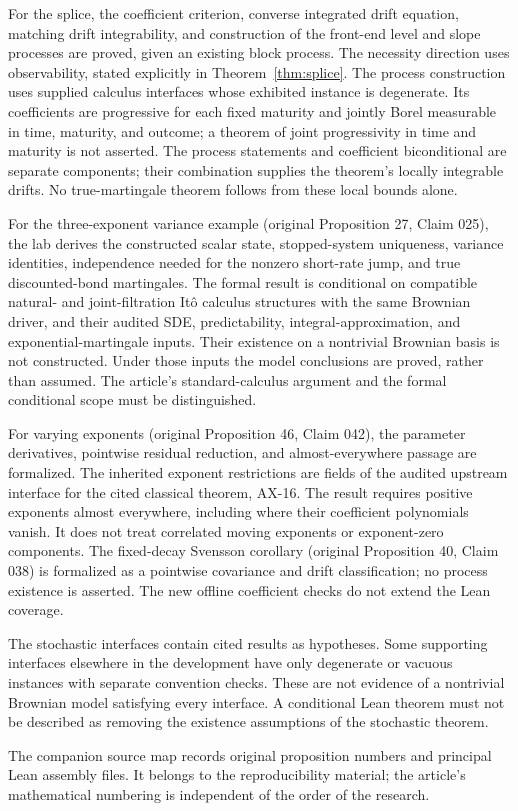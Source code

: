 For the splice, the coefficient criterion, converse integrated drift equation, matching drift integrability, and construction of the front-end level and slope processes are proved, given an existing block process. The necessity direction uses observability, stated explicitly in Theorem~\ref{thm:splice}. The process construction uses supplied calculus interfaces whose exhibited instance is degenerate. Its coefficients are progressive for each fixed maturity and jointly Borel measurable in time, maturity, and outcome; a theorem of joint progressivity in time and maturity is not asserted. The process statements and coefficient biconditional are separate components; their combination supplies the theorem's locally integrable drifts. No true-martingale theorem follows from these local bounds alone.

For the three-exponent variance example (original Proposition 27, Claim 025), the lab derives the constructed scalar state, stopped-system uniqueness, variance identities, independence needed for the nonzero short-rate jump, and true discounted-bond martingales. The formal result is conditional on compatible natural- and joint-filtration It\^o calculus structures with the same Brownian driver, and their audited SDE, predictability, integral-approximation, and exponential-martingale inputs. Their existence on a nontrivial Brownian basis is not constructed. Under those inputs the model conclusions are proved, rather than assumed. The article's standard-calculus argument and the formal conditional scope must be distinguished.

For varying exponents (original Proposition 46, Claim 042), the parameter derivatives, pointwise residual reduction, and almost-everywhere passage are formalized. The inherited exponent restrictions are fields of the audited upstream interface for the cited classical theorem, AX-16. The result requires positive exponents almost everywhere, including where their coefficient polynomials vanish. It does not treat correlated moving exponents or exponent-zero components. The fixed-decay Svensson corollary (original Proposition 40, Claim 038) is formalized as a pointwise covariance and drift classification; no process existence is asserted. The new offline coefficient checks do not extend the Lean coverage.

The stochastic interfaces contain cited results as hypotheses. Some supporting interfaces elsewhere in the development have only degenerate or vacuous instances with separate convention checks. These are not evidence of a nontrivial Brownian model satisfying every interface. A conditional Lean theorem must not be described as removing the existence assumptions of the stochastic theorem.

The companion source map records original proposition numbers and principal Lean assembly files. It belongs to the reproducibility material; the article's mathematical numbering is independent of the order of the research.
